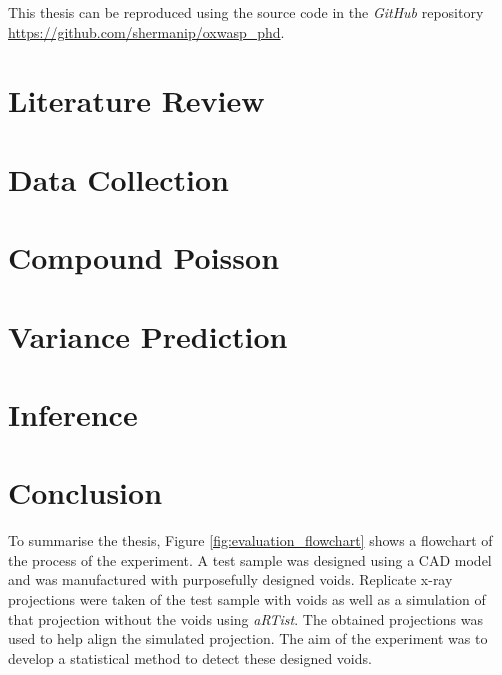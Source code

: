 \documentclass[12pt, a4paper]{memoir}
\begin{document}
This thesis can be reproduced using the source code in the \emph{GitHub} repository \url{https://github.com/shermanip/oxwasp_phd}.

\chapter{Literature Review}
\label{chapter1}


\chapter{Data Collection}
\label{chapter2}


\chapter{Compound Poisson}
\label{chapter3}


\chapter{Variance Prediction}
\label{chapter4}


\chapter{Inference}
\label{chapter5}


\chapter{Conclusion}
\label{chapter6}
To summarise the thesis, Figure \ref{fig:evaluation_flowchart} shows a flowchart of the process of the experiment. A test sample was designed using a CAD model and was manufactured with purposefully designed voids. Replicate x-ray projections were taken of the test sample with voids as well as a simulation of that projection without the voids using \emph{aRTist}. The obtained projections was used to help align the simulated projection. The aim of the experiment was to develop a statistical method to detect these designed voids.
\end{document}
